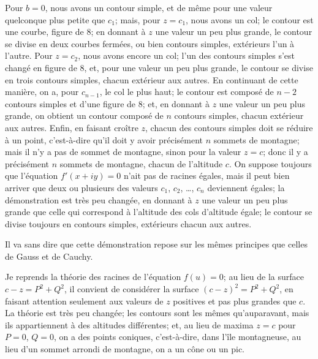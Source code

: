 \documentclass[11pt,a4paper]{article}
\begin{document}
Pour $b = 0$, nous avons un contour simple, et de m\^eme pour une valeur quelconque plus petite que $c_1$; mais, pour $z = c_1$, nous avons un col; le contour est une courbe, figure de 8; en donnant \`a $z$ une valeur un peu plus grande, le contour se divise en deux courbes ferm\'ees, ou bien contours simples, ext\'erieurs l'un \`a l'autre. Pour $z = c_2$, nous avons encore un col; l'un des contours simples s'est chang\'e en figure de 8, et, pour une valeur un peu plus grande, le contour se divise en trois contours simples, chacun ext\'erieur aux autres. En continuant de cette mani\`ere, on a, pour $c_{n-1}$, le col le plus haut; le contour est compos\'e de $n - 2$ contours simples et d'une figure de 8; et, en donnant \`a $z$ une valeur un peu plus grande, on obtient un contour compos\'e de $n$ contours simples, chacun ext\'erieur aux autres. Enfin, en faisant cro\^itre $z$, chacun des contours simples doit se r\'eduire \`a un point, c'est-\`a-dire qu'il doit y avoir pr\'ecis\'ement $n$ sommets de montagne; mais il n'y a pas de sommet de montagne, sinon pour la valeur $z = c$; donc il y a pr\'ecis\'ement $n$ sommets de montagne, chacun de l'altitude $c$. On suppose toujours que l'\'equation $f'(x + iy) = 0$ n'ait pas de racines \'egales, mais il peut bien arriver que deux ou plusieurs des valeurs $c_1$, $c_2$, \ldots, $c_n$ deviennent \'egales; la d\'emonstration est tr\`es peu chang\'ee, en donnant \`a $z$ une valeur un peu plus grande que celle qui correspond \`a l'altitude des cols d'altitude \'egale; le contour se divise toujours en contours simples, ext\'erieurs chacun aux autres.

Il va sans dire que cette d\'emonstration repose sur les m\^emes principes que celles de Gauss et de Cauchy.

Je reprends la th\'eorie des racines de l'\'equation $f(u) = 0$; au lieu de la surface $c - z = P^2 + Q^2$, il convient de consid\'erer la surface $(c - z)^2 = P^2 + Q^2$, en faisant attention seulement aux valeurs de $z$ positives et pas plus grandes que $c$. La th\'eorie est tr\`es peu chang\'ee; les contours sont les m\^emes qu'auparavant, mais ils appartiennent \`a des altitudes diff\'erentes; et, au lieu de maxima $z = c$ pour $P = 0$, $Q = 0$, on a des points coniques, c'est-\`a-dire, dans l'\^ile montagneuse, au lieu d'un sommet arrondi de montagne, on a un c\^one ou un pic.
\end{document}
